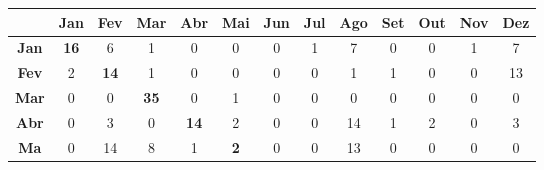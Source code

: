 \documentclass[
	12pt,				%
	openright,			%
	twoside,			%
	a4paper,			%
	english,			%
	brazil,				%
	svgnames
	]{abntex2}\usepackage[]{graphicx}\usepackage[]{color}
\begin{document}
\begin{table}[h]
\centering
\begin{tabular}{c|cccccccccccc}
\textbf{}    & \textbf{Jan}                     & \textbf{Fev}                     & \textbf{Mar}                     & \textbf{Abr}                     & \textbf{Mai}                    & \textbf{Jun}                    & \textbf{Jul}                     & \textbf{Ago}                     & \textbf{Set}                     & \textbf{Out}                     & \textbf{Nov}                    & \textbf{Dez}                     \\ \hline
\textbf{Jan} & \multicolumn{1}{c|}{\textbf{16}} & 6                                & 1                                & 0                                & 0                               & 0                               & 1                                & 7                                & 0                                & 0                                & 1                               & 7                                \\ \cline{2-3}
\textbf{Fev} & \multicolumn{1}{c|}{2}           & \multicolumn{1}{c|}{\textbf{14}} & 1                                & 0                                & 0                               & 0                               & 0                                & 1                                & 1                                & 0                                & 0                               & 13                               \\ \cline{3-4}
\textbf{Mar} & 0                                & \multicolumn{1}{c|}{0}           & \multicolumn{1}{c|}{\textbf{35}} & 0                                & 1                               & 0                               & 0                                & 0                                & 0                                & 0                                & 0                               & 0                                \\ \cline{4-5}
\textbf{Abr} & 0                                & 3                                & \multicolumn{1}{c|}{0}           & \multicolumn{1}{c|}{\textbf{14}} & 2                               & 0                               & 0                                & 14                               & 1                                & 2                                & 0                               & 3                                \\ \cline{5-6}
\textbf{Ma}  & 0                                & 14                               & 8                                & \multicolumn{1}{c|}{1}           & \multicolumn{1}{c|}{\textbf{2}} & 0                               & 0                                & 13                               & 0                                & 0                                & 0                               & 0                                \\ \cline{6-7}

\end{tabular}
\end{table}
\end{document}
